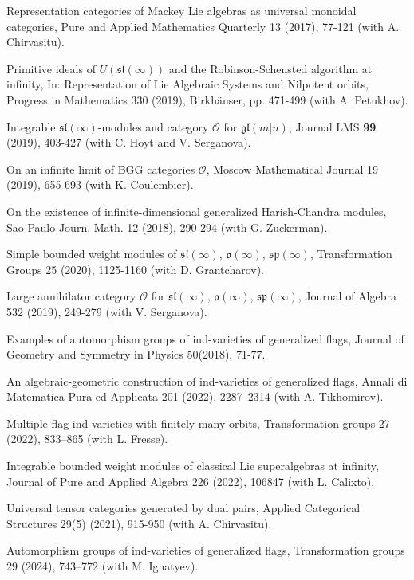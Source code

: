 \documentclass[11pt]{amsart}
\begin{document}
\myss \label{75.} Representation categories of Mackey Lie algebras as universal monoidal categories, Pure and Applied Mathematics Quarterly 13 (2017), 77-121 (with A. Chirvasitu).

\myss \label{76.} Primitive ideals of $U(\mathfrak{sl}(\infty))$ and the Robinson-Schensted algorithm at infinity, In: Representation of Lie Algebraic Systems and Nilpotent orbits, Progress in Mathematics 330 (2019), Birkhäuser, pp. 471-499 (with A. Petukhov).

\myss \label{77.} Integrable $\mathfrak{sl}(\infty)$-modules and category $\mathcal O$ for $\mathfrak{gl}(m|n)$, Journal LMS \textbf{99} (2019), 403-427 (with C. Hoyt and V. Serganova).

\myss \label{78.} On an infinite	limit of BGG categories $\mathcal O$, Moscow Mathematical Journal 19 (2019), 655-693 (with K. Coulembier).

\myss \label{79.} On the existence of infinite-dimensional generalized Harish-Chandra modules, Sao-Paulo Journ. Math. 12 (2018), 290-294 (with G. Zuckerman).

\myss \label{80.} Simple bounded weight modules of $\mathfrak{sl}(\infty)$, $\mathfrak{o}(\infty)$, $\mathfrak{sp}(\infty)$, Transformation Groups 25 (2020), 1125-1160 (with D. Grantcharov).

\myss \label{81.} Large annihilator category $\mathcal O$ for $\mathfrak{sl}(\infty)$, $\mathfrak{o}(\infty)$, $\mathfrak{sp}(\infty)$, Journal of Algebra 532 (2019), 249-279 (with V. Serganova).

\myss \label{82.} Examples of automorphism groups of ind-varieties of generalized flags, Journal of Geometry and Symmetry in Physics 50(2018), 71-77.

\myss \label{83.} An algebraic-geometric construction of ind-varieties of generalized flags, Annali di Matematica Pura ed Applicata 201 (2022), 2287–2314 (with A. Tikhomirov).


\myss \label{84.} Multiple flag ind-varieties with finitely many orbits, Transformation groups 27 (2022), 833–865 (with L. Fresse).

\myss \label{85.} Integrable bounded weight modules of classical Lie superalgebras at infinity, Journal of Pure and Applied Algebra 226 (2022), 106847 (with L. Calixto).


\myss \label{86.} Universal tensor categories generated by dual pairs, Applied Categorical Structures 29(5) (2021), 915-950 (with A. Chirvasitu).

\myss \label{87.} Automorphism groups of ind-varieties of generalized flags, Transformation groups 29 (2024), 743–772 (with M. Ignatyev).
\end{document}
